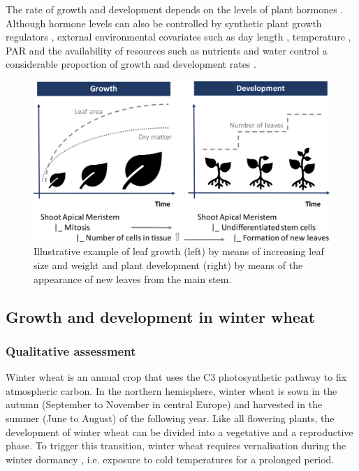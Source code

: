 The rate of growth and development depends on the levels of plant hormones \citep{shani_role_2006}. Although hormone levels can also be controlled by synthetic plant growth regulators \citep{gaspar_plant_1996}, external environmental covariates such as day length \cite{haverkort_modelling_1995}, temperature \citep{porter_temperatures_1999}, \gls{PAR} \citep{abbate_effects_1995} and the availability of resources such as nutrients and water control a considerable proportion of growth and development rates \citep{masle_competition_1985,korner_paradigm_2015}.

\begin{figure}[H]
    \centering
    \includegraphics[width=\textwidth]{01-Introduction/img/growth_and_development.pdf}
    \caption{Illustrative example of leaf growth (left) by means of increasing leaf size and weight and plant development (right) by means of the appearance of new leaves from the main stem.}
    \label{fig:growth-development-biology}
\end{figure}

\subsection{Growth and development in winter wheat}
\subsubsection{Qualitative assessment}
\label{subsubsec:ww-qualitative-assessment}

Winter wheat is an annual crop that uses the C3 photosynthetic pathway to fix atmospheric carbon. In the northern hemisphere, winter wheat is sown in the autumn (September to November in central Europe) and harvested in the summer (June to August) of the following year. Like all flowering plants, the development of winter wheat can be divided into a vegetative and a reproductive phase. To trigger this transition, winter wheat requires vernalisation during the winter dormancy \citep{fedorov_photoperiodism_1976}, i.e. exposure to cold temperatures for a prolonged period.

